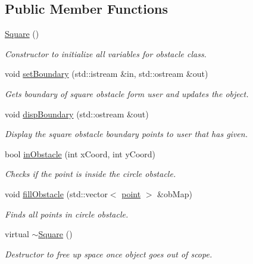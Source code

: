 \subsection*{Public Member Functions}
\begin{DoxyCompactItemize}
\item 
\hyperlink{classSquare_a3dc7ff9aefc2725172b5d3153973d243}{Square} ()
\begin{DoxyCompactList}\small\item\em Constructor to initialize all variables for obstacle class. \end{DoxyCompactList}\item 
void \hyperlink{classSquare_a1979921c7ae05d518c4392e0d5b8c156}{set\+Boundary} (std\+::istream \&in, std\+::ostream \&out)
\begin{DoxyCompactList}\small\item\em Gets boundary of square obstacle form user and updates the object. \end{DoxyCompactList}\item 
void \hyperlink{classSquare_afb76b9979da299090aa92f7e02465843}{disp\+Boundary} (std\+::ostream \&out)
\begin{DoxyCompactList}\small\item\em Display the square obstacle boundary points to user that has given. \end{DoxyCompactList}\item 
bool \hyperlink{classSquare_aa07ba26ea5675fea6dc90b2172ab13dd}{in\+Obstacle} (int x\+Coord, int y\+Coord)
\begin{DoxyCompactList}\small\item\em Checks if the point is inside the circle obstacle. \end{DoxyCompactList}\item 
void \hyperlink{classSquare_a395dc9319c9609d810e3f22eddbdcc81}{fill\+Obstacle} (std\+::vector$<$ \hyperlink{structpoint}{point} $>$ \&ob\+Map)
\begin{DoxyCompactList}\small\item\em Finds all points in circle obstacle. \end{DoxyCompactList}\item 
virtual \hyperlink{classSquare_a90af7ce1060cff7b717ceddb333846b8}{$\sim$\+Square} ()
\begin{DoxyCompactList}\small\item\em Destructor to free up space once object goes out of scope. \end{DoxyCompactList}\end{DoxyCompactItemize}


